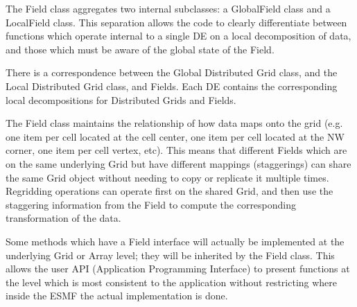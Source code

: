 



The Field class aggregates two internal subclasses: a GlobalField class
and a LocalField class.  This separation allows the code to clearly
differentiate between functions which operate internal to a single DE
on a local decomposition of data, 
and those which must be aware of the
global state of the Field.  
 
There is a correspondence between the Global Distributed Grid class,
and the Local Distributed Grid class, and Fields.  Each DE contains
the corresponding local decompositions for Distributed Grids and Fields.

The Field class maintains the relationship of
how data maps onto the grid (e.g. one item per cell located at
the cell center, one item per cell located at the NW corner, 
one item per cell vertex, etc).  This means that different Fields
which are on the same underlying Grid but have different
mappings (staggerings) can share the same Grid object without
needing to copy or replicate it multiple times.  Regridding
operations can operate first on the shared Grid, and then
use the staggering information from the Field to compute the
corresponding transformation of the data.

Some methods which have a Field interface will actually be
implemented at the underlying Grid or Array level; they
will be inherited by the Field class.  This allows the user
API (Application Programming Interface) to present functions at
the level which is most consistent to the application without
restricting where inside the ESMF the actual implementation
is done.

